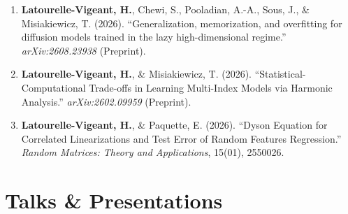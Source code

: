 \documentclass[12pt]{moderncv}
\begin{document}
\begin{enumerate}
    \item \textbf{Latourelle-Vigeant, H.}, Chewi, S., Pooladian, A.-A., Sous, J., \& Misiakiewicz, T. (2026). ``Generalization, memorization, and overfitting for diffusion models trained in the lazy high-dimensional regime.'' \textit{arXiv:2608.23938} (Preprint).

    \vspace{0.4em}
    \item \textbf{Latourelle-Vigeant, H.}, \& Misiakiewicz, T. (2026). ``Statistical-Computational Trade-offs in Learning Multi-Index Models via Harmonic Analysis.'' \textit{arXiv:2602.09959} (Preprint).

    \vspace{0.4em}
    \item \textbf{Latourelle-Vigeant, H.}, \& Paquette, E. (2026). ``Dyson Equation for Correlated Linearizations and Test Error of Random Features Regression.'' \textit{Random Matrices: Theory and Applications}, 15(01), 2550026.
\end{enumerate}

\section{Talks \& Presentations}
\end{document}
